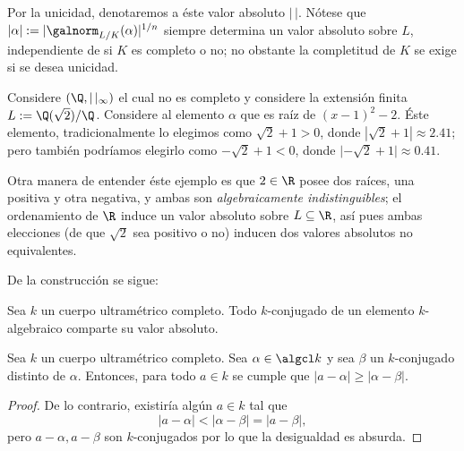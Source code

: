 \documentclass[teoria-numeros.tex]{subfiles}
\begin{document}
Por la unicidad, denotaremos a éste valor absoluto $|\,|$.
Nótese que $|\alpha| := |\galnorm_{L/K}(\alpha)|^{1/n}$ siempre determina un valor absoluto sobre $L$, independiente de si $K$ es completo o no;
no obstante la completitud de $K$ se exige si se desea unicidad.

\begin{exn}
	Considere $(\Q, |\,|_\infty)$ el cual no es completo y considere la extensión finita $L := \Q(\sqrt{2})/\Q$.
	Considere al elemento $\alpha$ que es raíz de $(x - 1)^2 - 2$.
	Éste elemento, tradicionalmente lo elegimos como $\sqrt{2} + 1 > 0$, donde $|\sqrt{2} + 1| \approx 2.41$;
	pero también podríamos elegirlo como $-\sqrt{2} + 1 < 0$, donde $\lvert-\sqrt{2} + 1\rvert \approx 0.41$.

	Otra manera de entender éste ejemplo es que $2 \in \R$ posee dos raíces, una positiva y otra negativa, y ambas son \textit{algebraicamente indistinguibles};
	el ordenamiento de $\R$ induce un valor absoluto sobre $L \subseteq \R$, así pues ambas elecciones (de que $\sqrt{2}$ sea positivo o no) inducen dos
	valores absolutos no equivalentes.
\end{exn}

De la construcción se sigue:
\begin{cor}\label{thm:conjs_share_norm}
	Sea $k$ un cuerpo ultramétrico completo.
	Todo $k$-conjugado de un elemento $k$-algebraico comparte su valor absoluto.
\end{cor}

\begin{cor}\label{thm:krasner_lemma}
	Sea $k$ un cuerpo ultramétrico completo.
	Sea $\alpha \in \algcl k$ y sea $\beta$ un $k$-conjugado distinto de $\alpha$.
	Entonces, para todo $a \in k$ se cumple que $|a - \alpha| \ge |\alpha - \beta|$.
	
\end{cor}
\begin{proof}
	De lo contrario, existiría algún $a \in k$ tal que
	$$ |a - \alpha| < |\alpha - \beta| = |a - \beta|, $$
	pero $a - \alpha, a - \beta$ son $k$-conjugados por lo que la desigualdad es absurda.
\end{proof}
\end{document}
